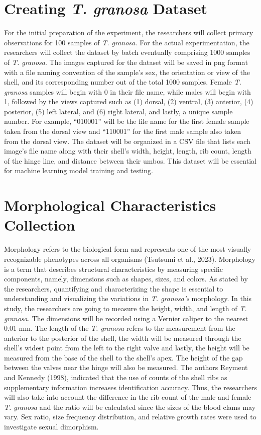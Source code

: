 \section{Creating \textit{T. granosa} Dataset}
For the initial preparation of the experiment, the researchers will collect primary observations for 100 samples of \textit{T. granosa.} For the actual experimentation, the researchers will collect the dataset by batch eventually comprising 1000 samples of \textit{T. granosa}. The images captured for the dataset will be saved in png format with a file naming convention of the sample’s sex, the orientation or view of the shell, and its corresponding number out of the total 1000 samples. Female \textit{T. granosa} samples will begin with 0 in their file name, while males will begin with 1, followed by the views captured such as (1) dorsal, (2) ventral, (3) anterior, (4) posterior, (5) left lateral, and (6) right lateral, and lastly, a unique sample number. For example, “010001” will be the file name for the first female sample taken from the dorsal view and “110001” for the first male sample also taken from the dorsal view. The dataset will be organized in a CSV file that lists each image’s file name along with their shell’s width, height, length, rib count, length of the hinge line, and distance between their umbos. This dataset will be essential for machine learning model training and testing. 

\section{Morphological Characteristics Collection}
Morphology refers to the biological form and represents one of the most visually recognizable phenotypes across all organisms (Tsutsumi et al., 2023). Morphology is a term that describes structural characteristics by measuring specific components, namely, dimensions such as shapes, sizes, and colors. As stated by the researchers, quantifying and characterizing the shape is essential to understanding and visualizing the variations in \textit{T. granosa’s} morphology. 
In this study, the researchers are going to measure the height, width, and length of \textit{T. granosa.} The dimensions will be recorded using a Vernier caliper to the nearest 0.01 mm. The length of the \textit{T. granosa} refers to the measurement from the anterior to the posterior of the shell, the width will be measured through the shell’s widest point from the left to the right valve and lastly, the height will be measured from the base of the shell to the shell’s apex. The height of the gap between the valves near the hinge will also be measured. The authors Reyment and Kennedy (1998), indicated that the use of counts of the shell ribs as supplementary information increases identification accuracy. Thus, the researchers will also take into account the difference in the rib count of the male and female \textit{T. granosa} and the ratio will be calculated since the sizes of the blood clams may vary.
Sex ratio, size frequency distribution, and relative growth rates were used to investigate sexual dimorphism.

